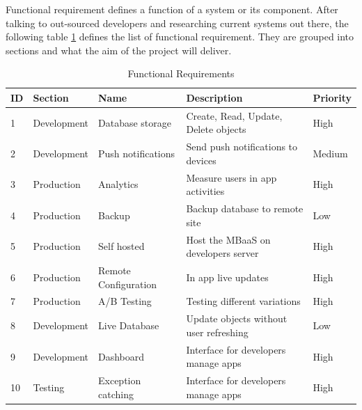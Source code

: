Functional requirement defines a function of a system or its component. After talking to out-sourced developers and researching current systems out there, the following table \ref{tb:functional} defines the list of functional requirement. They are grouped into sections and what the aim of the project will deliver.

\begin{table}[h]
\centering
\caption{Functional Requirements}
\label{tb:functional}
\begin{tabular}{|l|l|l|l|l|}
\hline
\cellcolor{green!20}ID & \cellcolor{green!20}Section  & \cellcolor{green!20}Name  & \cellcolor{green!20}Description        & \cellcolor{green!20}Priority \\ \hline
1                      & Development                  & Database storage          & Create, Read, Update, Delete objects   & High   \\ \hline
2                      & Development                  & Push notifications        & Send push notifications to devices     & Medium \\ \hline
3                      & Production                   & Analytics                 & Measure users in app activities        & High   \\ \hline
4                      & Production                   & Backup                    & Backup database to remote site         & Low    \\ \hline
5                      & Production                   & Self hosted               & Host the MBaaS on developers server    & High   \\ \hline
6                      & Production                   & Remote Configuration      & In app live updates                    & High   \\ \hline
7                      & Production                   & A/B Testing               & Testing different variations           & High   \\ \hline
8                      & Development                  & Live Database             & Update objects without user refreshing & Low    \\ \hline
9                      & Development                  & Dashboard                & Interface for developers manage apps   & High   \\ \hline
10                     & Testing                      & Exception catching      & Interface for developers manage apps   & High   \\ \hline
\end{tabular}
\end{table}

